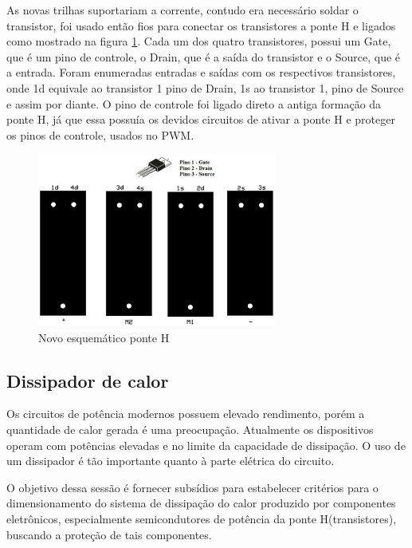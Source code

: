 As novas trilhas suportariam a corrente, contudo era necessário soldar o transistor, foi usado então fios para conectar os transistores a ponte H e ligados como mostrado na figura \ref{fig:novo_esquematico_ponte_h}. Cada um dos quatro transistores, possui um Gate, que é um pino de controle, o Drain, que é a saída do transistor e o Source, que é a entrada. Foram enumeradas entradas e saídas com os respectivos transistores, onde 1d equivale ao transistor 1 pino de Drain, 1s ao transistor 1, pino de Source e assim por diante. O pino de controle foi ligado direto a antiga formação da ponte H, já que essa possuía os devidos circuitos de ativar a ponte H e proteger os pinos de controle, usados no PWM.

\begin{figure}[!ht]
  \center
  \includegraphics[width=0.7\textwidth]{figuras/resultados/novo_esquematico_ponte_h}
  \caption{Novo esquemático ponte H}
  \label{fig:novo_esquematico_ponte_h}
\end{figure}


\subsection{Dissipador de calor}

Os circuitos de potência modernos possuem elevado rendimento, porém a quantidade de
calor gerada é uma preocupação. Atualmente os dispositivos operam com potências elevadas
e no limite da capacidade de dissipação. O uso de um dissipador é tão importante quanto à
parte elétrica do circuito.

O objetivo dessa sessão é fornecer subsídios para estabelecer critérios para o
dimensionamento do sistema de dissipação do calor produzido por componentes eletrônicos,
especialmente semicondutores de potência da ponte H(transistores), buscando a proteção de
tais componentes.

